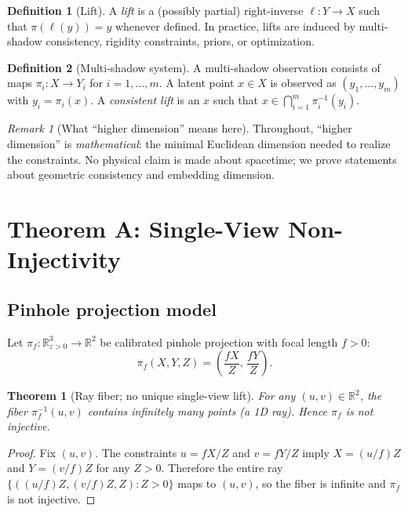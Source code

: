 \documentclass[11pt]{article}
\theoremstyle{definition}
\newtheorem{definition}{Definition}[section]
\theoremstyle{plain}
\newtheorem{theorem}{Theorem}[section]
\theoremstyle{remark}
\newtheorem{remark}{Remark}[section]
\begin{document}
\begin{definition}[Lift]
A \emph{lift} is a (possibly partial) right-inverse $\ell:Y\to X$ such that $\pi(\ell(y))=y$ whenever defined.
In practice, lifts are induced by multi-shadow consistency, rigidity constraints, priors, or optimization.
\end{definition}

\begin{definition}[Multi-shadow system]
A multi-shadow observation consists of maps $\pi_i:X\to Y_i$ for $i=1,\dots,m$.
A latent point $x\in X$ is observed as $(y_1,\dots,y_m)$ with $y_i=\pi_i(x)$.
A \emph{consistent lift} is an $x$ such that $x\in\bigcap_{i=1}^m \pi_i^{-1}(y_i)$.
\end{definition}

\begin{remark}[What ``higher dimension'' means here]
Throughout, ``higher dimension'' is \emph{mathematical}: the minimal Euclidean dimension needed to realize the constraints.
No physical claim is made about spacetime; we prove statements about geometric consistency and embedding dimension.
\end{remark}

\section{Theorem A: Single-View Non-Injectivity}

\subsection{Pinhole projection model}
Let $\pi_f:\mathbb{R}^3_{z>0}\to\mathbb{R}^2$ be calibrated pinhole projection with focal length $f>0$:
\[
  \pi_f(X,Y,Z) = \left(\frac{fX}{Z},\, \frac{fY}{Z}\right).
\]

\begin{theorem}[Ray fiber; no unique single-view lift]\label{thm:A}
For any $(u,v)\in\mathbb{R}^2$, the fiber $\pi_f^{-1}(u,v)$ contains infinitely many points (a 1D ray). Hence $\pi_f$ is not injective.
\end{theorem}

\begin{proof}
Fix $(u,v)$. The constraints $u=fX/Z$ and $v=fY/Z$ imply $X=(u/f)Z$ and $Y=(v/f)Z$ for any $Z>0$.
Therefore the entire ray $\{((u/f)Z,(v/f)Z,Z):Z>0\}$ maps to $(u,v)$, so the fiber is infinite and $\pi_f$ is not injective.
\end{proof}
\end{document}
